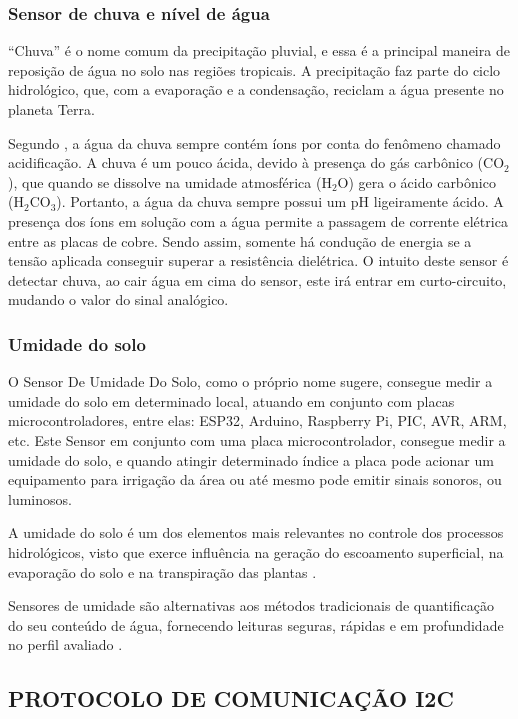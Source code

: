 \documentclass[%
  article,%
  a4paper,%
  12pt,%
  fleqn,%
  oneside,%
  chapter = TITLE,%
  section = TITLE,%
]{abntex2}
\begin{document}
\subsubsection{Sensor de chuva e nível de água}

``Chuva'' é o nome comum da precipitação pluvial, e essa é a principal maneira de reposição de água no solo nas regiões tropicais. A precipitação faz parte do ciclo hidrológico, que, com a evaporação e a condensação, reciclam a água presente no planeta Terra.

 
Segundo \citet{padua2010}, a água da chuva sempre contém íons por conta do fenômeno chamado acidificação. A chuva é um pouco ácida, devido à presença do gás carbônico (CO$_2$), que quando se dissolve na umidade atmosférica (H$_2$O) gera o ácido carbônico (\quad H$_2$CO$_3$). Portanto, a água da chuva sempre possui um pH ligeiramente ácido. A presença dos íons em solução com a água permite a passagem de corrente elétrica entre as placas de cobre. Sendo assim, somente há condução de energia se a tensão aplicada conseguir superar a resistência dielétrica. O intuito deste sensor é detectar chuva, ao cair água em cima do sensor, este irá entrar em curto-circuito, mudando o valor do sinal analógico.

\subsubsection{Umidade do solo }

O Sensor De Umidade Do Solo, como o próprio nome sugere, consegue medir a umidade do solo em determinado local, atuando em conjunto com placas microcontroladores, entre elas: ESP32, Arduino, Raspberry Pi, PIC, AVR, ARM, etc. Este Sensor em conjunto com uma placa microcontrolador, consegue medir a umidade do solo, e quando atingir determinado índice a placa pode acionar um equipamento para irrigação da área ou até mesmo pode emitir sinais sonoros, ou luminosos.

A umidade do solo é um dos elementos mais relevantes no controle dos processos hidrológicos, visto que exerce influência na geração do escoamento superficial, na evaporação do solo e na transpiração das plantas \cite{AvilaEtAl2010v2}. 

Sensores de umidade são alternativas aos métodos tradicionais de quantificação do seu conteúdo de água, fornecendo leituras seguras, rápidas e em profundidade no perfil avaliado \cite{SilvaEtAl2004}.


\subsection{PROTOCOLO DE COMUNICAÇÃO I2C  }
 
\end{document}
